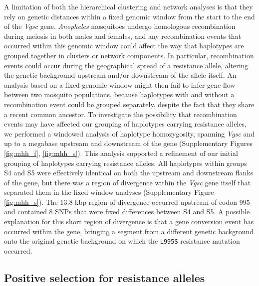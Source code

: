 \documentclass[a4paper,11pt,abstracton,hidelinks]{scrartcl}
\begin{document}
%
A limitation of both the hierarchical clustering and network analyses is that they rely on genetic distances within a fixed genomic window from the start to the end of the \textit{Vgsc} gene.
%
\textit{Anopheles} mosquitoes undergo homologous recombination during meiosis in both males and females, and any recombination events that occurred within this genomic window could affect the way that haplotypes are grouped together in clusters or network components.
%
In particular, recombination events could occur during the geographical spread of a resistance allele, altering the genetic background upstream and/or downstream of the allele itself.
%
An analysis based on a fixed genomic window might then fail to infer gene flow between two mosquito populations, because haplotypes with and without a recombination event could be grouped separately, despite the fact that they share a recent common ancestor.
%
To investigate the possibility that recombination events may have affected our grouping of haplotypes carrying resistance alleles, we performed a windowed analysis of haplotype homozygosity, spanning \textit{Vgsc} and up to a megabase upstream and downstream of the gene (Supplementary Figures \ref{fig:mhh_f}, \ref{fig:mhh_s}).
%
This analysis supported a refinement of our initial grouping of haplotypes carrying resistance alleles.
%
All haplotypes within groups S4 and S5 were effectively identical on both the upstream and downstream flanks of the gene, but there was a region of divergence within the \textit{Vgsc} gene itself that separated them in the fixed window analyses (Supplementary Figure \ref{fig:mhh_s}).
%
The 13.8 kbp region of divergence occurred upstream of codon 995 and contained 8 SNPs that were fixed differences between S4 and S5.
%
A possible explanation for this short region of divergence is that a gene conversion event has occurred within the gene, bringing a segment from a different genetic background onto the original genetic background on which the \texttt{L995S} resistance mutation occurred.
%


\subsection*{Positive selection for resistance alleles}
\end{document}
